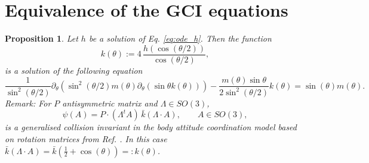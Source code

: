 \documentclass[12pt]{article}
\def\pa{\partial}
\newtheorem{proposition}[theorem]{Proposition}
\newcommand{\lp}{\left(}
\newcommand{\rp}{\right)}
\newcommand{\be}{\begin{equation}}
\newcommand{\ee}{\end{equation}}
\begin{document}
\section{Equivalence of the GCI equations}

\begin{proposition}\label{propo:h_and_k}
Let $h$ be a solution of Eq. \eqref{eq:ode_h}. Then the function
\be\label{def:k} k(\theta):=4\,\frac{h\lp\cos(\theta/2)\rp}{\cos(\theta/2)},\ee
is a solution of the following equation
\be\label{eq:ode_GCI_matrices}
\frac{1}{\sin^2(\theta/2)}\pa_\theta \lp \sin^2(\theta/2) m(\theta) \pa_\theta \lp \sin \theta k(\theta) \rp\rp - \frac{m(\theta) \sin\theta }{2\sin^2(\theta/2)} k(\theta) =\sin(\theta) m(\theta).
\ee
Remark: For $P$ antisymmetric matrix and $\Lambda\in SO(3)$,
$$\psi(A)= P\cdot (\Lambda^t A)\, \bar k(\Lambda\cdot A), \qquad A\in SO(3),$$
is a generalised collision invariant in the body attitude coordination model based on rotation matrices from Ref. \cite{bodyattitude}. In this case $\bar k(\Lambda \cdot A)= \bar k\lp \frac{1}{2}+\cos(\theta)\rp =:k(\theta)$.
\end{proposition}
\end{document}
